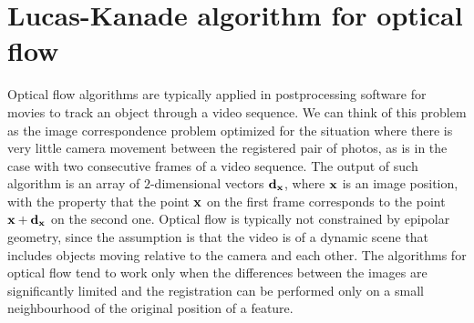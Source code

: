 




\section{Lucas-Kanade algorithm for optical flow} 
\label{sec:optfl}

Optical flow algorithms are typically applied in postprocessing software for movies to track an object through a video sequence. 
We can think of this problem as the image correspondence problem optimized for the situation where there is very little camera movement between the registered pair of photos, as is in the case with two consecutive frames of a video sequence. 
The output of such algorithm is an array of $2$-dimensional vectors $\mathbf{d}_{\mathbf{x}}$, where $\mathbf{x}$ is an image position, with the property that the point $\mathbf{x}$ on the first frame corresponds to the point $\mathbf{x} + \mathbf{d}_{\mathbf{x}}$ on the second one. 
Optical flow is typically not constrained by epipolar geometry, since the assumption is that the video is of a dynamic scene that includes objects moving relative to the camera and each other.
The algorithms for optical flow tend to work only when the differences between the images are significantly limited and the registration can be performed only on a small neighbourhood of the original position of a feature. 

